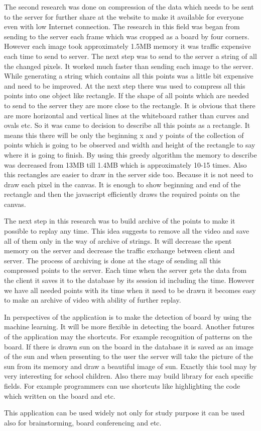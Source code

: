 The second research was done on compression of the data which needs to be sent to the server for further share at the website to make it available for everyone even with low Internet connection. The research in this field was began from sending to the server each frame which was cropped as a board by four corners. However each image took approximately 1.5MB memory it was traffic expensive each time to send to server. The next step was to send to the server a string of all the changed pixels. It worked much faster than sending each image to the server. While generating a string which contains all this points was a little bit expensive and need to be improved. At the next step there was used to compress all this points into one object like rectangle. If the shape of all points which are needed to send to the server they are more close to the rectangle. It is obvious that there are more horizontal and vertical lines at the whiteboard rather than curves and ovals etc. So it was came to decision to describe all this points as a rectangle. It means this there will be only the beginning x and y points of the collection of points which is going to be observed and width and height of the rectangle to say where it is going to finish. By using this greedy algorithm the memory to describe was decreased from 13MB till 1.4MB which is approximately 10-15 times. Also this rectangles are easier to draw in the server side too. Because it is not need to draw each pixel in the canvas. It is enough to show beginning and end of the rectangle and then the javascript efficiently draws the required points on the canvas.

The next step in this research was to build archive of the points to make it possible to replay any time. This idea suggests to remove all the video and save all of them only in the way of archive of strings. It will decrease the spent memory on the server and decrease the traffic exchange between client and server. The process of archiving is done at the stage of sending all this compressed points to the server. Each time when the server gets the data from the client it saves it to the database by its session id including the time. However we have all needed points with its time when it need to be drawn it becomes easy to make an archive of video with ability of further replay. 

In perspectives of the application is to make the detection of board by using the machine learning. It will be more flexible in detecting the board. Another futures of the application may the shortcuts. For example recognition of patterns on the board. If there is drawn sun on the board in the database it is saved as an image of the sun and when presenting to the user the server will take the picture of the sun from its memory and draw a beautiful image of sun. Exactly this tool may by very interesting for school children. Also there may build library for each specific fields. For example programmers can use shortcuts like highlighting the code which written on the board and etc. 

This application can be used widely not only for study purpose it can be used also for brainstorming, board conferencing and etc.   
